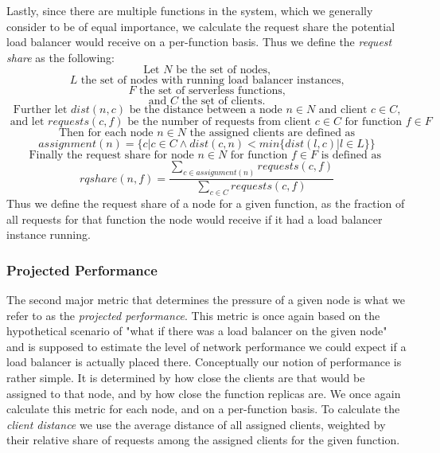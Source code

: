 Lastly, since there are multiple functions in the system, which we generally consider to be of equal importance, we calculate the request share the potential load balancer would receive on a per-function basis.
Thus we define the \textit{request share} as the following:
\[ \text{Let }N\text{ be the set of nodes,} \]
\[ L\text{ the set of nodes with running load balancer instances,} \]
\[ F\text{ the set of serverless functions,} \]
\[ \text{and }C\text{ the set of clients.} \]
\[ \text{Further let } dist(n,c) \text{ be the distance between a node } n \in N \text{ and client }c \in C\text{,}\]
\[ \text{ and let }requests(c, f) \text{ be the number of requests from client }c \in C \text{ for function }f \in F\]
\[ \text{Then for each node }n \in N\text{ the assigned clients are defined as} \]
\[ assignment(n) = \{c | c \in C \land dist(c,n) < min\{dist(l, c) | l \in L\}\}\]
\[ \text{Finally the request share for node } n \in N \text{ for function }f \in F \text{ is defined as } \]
\[ rqshare(n,f) = \frac{\sum_{c \in assignment(n)}requests(c,f)}{\sum_{c \in C}requests(c,f)}\]
Thus we define the request share of a node for a given function, as the fraction of all requests for that function the node would receive if it had a load balancer instance running.
\subsubsection{Projected Performance}
The second major metric that determines the pressure of a given node is what we refer to as the \textit{projected performance}.
This metric is once again based on the hypothetical scenario of "what if there was a load balancer on the given node" and is supposed to estimate the level of network performance we could expect if a load balancer is actually placed there.
Conceptually our notion of performance is rather simple.
It is determined by how close the clients are that would be assigned to that node, and by how close the function replicas are.
We once again calculate this metric for each node, and on a per-function basis.
To calculate the \textit{client distance} we use the average distance of all assigned clients, weighted by their relative share of requests among the assigned clients for the given function.

